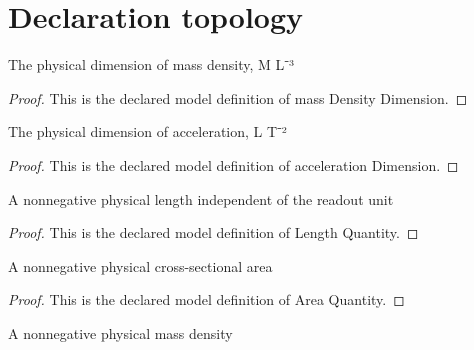 \section{Declaration topology}
\begin{definition}
  \label{def:physics:phyx-mini-0385:phyxminiproblems-problemphyxmini0385-massdensitydimension}
  The physical dimension of mass density, M L⁻³
\end{definition}
\begin{proof}
  This is the declared model definition of mass Density Dimension.
\end{proof}
\begin{definition}
  \label{def:physics:phyx-mini-0385:phyxminiproblems-problemphyxmini0385-accelerationdimension}
  The physical dimension of acceleration, L T⁻²
\end{definition}
\begin{proof}
  This is the declared model definition of acceleration Dimension.
\end{proof}
\begin{definition}
  \label{def:physics:phyx-mini-0385:phyxminiproblems-problemphyxmini0385-lengthquantity}
  A nonnegative physical length independent of the readout unit
\end{definition}
\begin{proof}
  This is the declared model definition of Length Quantity.
\end{proof}
\begin{definition}
  \label{def:physics:phyx-mini-0385:phyxminiproblems-problemphyxmini0385-areaquantity}
  A nonnegative physical cross-sectional area
\end{definition}
\begin{proof}
  This is the declared model definition of Area Quantity.
\end{proof}
\begin{definition}
  \label{def:physics:phyx-mini-0385:phyxminiproblems-problemphyxmini0385-massdensityquantity}
  A nonnegative physical mass density
\end{definition}
